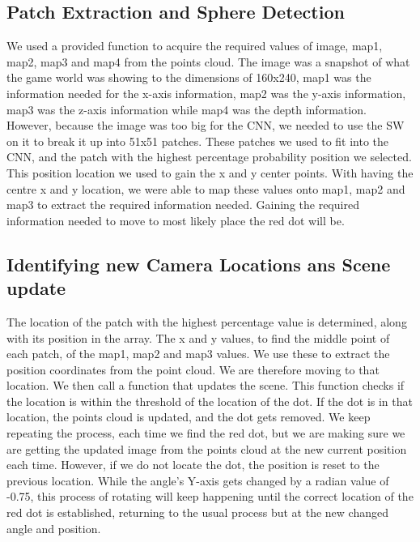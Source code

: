 \documentclass[a4paper,10pt]{article}
\begin{document}
\subsection{Patch Extraction and Sphere Detection}
We used a provided function to acquire the required values of image, map1, map2, map3 and map4 from the points cloud. The image was a snapshot of what the game world was showing to the dimensions of 160x240, map1 was the information needed for the x-axis information, map2 was the y-axis information, map3 was the z-axis information while map4 was the depth information. However, because the image was too big for the CNN, we needed to use the SW on it to break it up into 51x51 patches. These patches we used to fit into the CNN, and the patch with the highest percentage probability position we selected. This position location we used to gain the x and y center points. With having the centre x and y location, we were able to map these values onto map1, map2 and map3 to extract the required information needed. Gaining the required information needed to move to most likely place the red dot will be.

\subsection{Identifying new Camera Locations ans Scene update}
The location of the patch with the highest percentage value is determined, along with its position in the array. The x and y values, to find the middle point of each patch, of the map1, map2 and map3 values. We use these to extract the position coordinates from the point cloud. We are therefore moving to that location. We then call a function that updates the scene. This function checks if the location is within the threshold of the location of the dot. If the dot is in that location, the points cloud is updated, and the dot gets removed. We keep repeating the process, each time we find the red dot, but we are making sure we are getting the updated image from the points cloud at the new current position each time. However, if we do not locate the dot, the position is reset to the previous location. While the angle's Y-axis gets changed by a radian value of -0.75, this process of rotating will keep happening until the correct location of the red dot is established, returning to the usual process but at the new changed angle and position.



\end{document}
